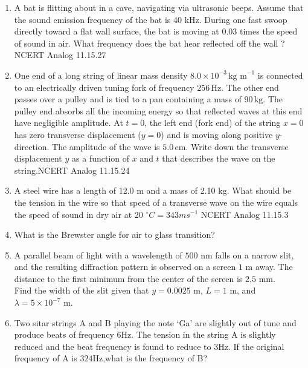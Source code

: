 \begin{enumerate}[label=\thesection.\arabic*,ref=\thesection.\theenumi]
\solution
\newpage

\item A bat is flitting about in a cave, navigating via ultrasonic beeps. Assume that the
sound emission frequency of the bat is 40 kHz. During one fast swoop directly
toward a flat wall surface, the bat is moving at 0.03 times the speed of sound in air.
What frequency does the bat hear reflected off the wall ? \hfill{NCERT Analog 11.15.27}\\
\solution
\pagebreak
\item One end of a long string of linear mass density $8.0 \times 10^{-3} \, \text{kg m}^{-1}$ is connected to an electrically driven tuning fork of frequency $256 \, \text{Hz}$. The other end passes over a pulley and is tied to a pan containing a mass of $90 \, \text{kg}$. The pulley end absorbs all the incoming energy so that reflected waves at this end have negligible amplitude. At $t=0$, the left end (fork end) of the string $x=0$ has zero transverse displacement ($y=0$) and is moving along positive $y$-direction. The amplitude of the wave is $5.0 \, \text{cm}$. Write down the transverse displacement $y$ as a function of $x$ and $t$ that describes the wave on the string.\hfill{NCERT Analog 11.15.24} \\
\solution
\pagebreak
\item A steel wire has a length of 12.0 m and a mass of 2.10 kg. What should be the
tension in the wire so that speed of a transverse wave on the wire equals the speed
of sound in dry air at 20 $^{\circ} C = 343ms^{-1}$ \hfill{NCERT Analog 11.15.3}\\
\solution
\pagebreak
\item What is the Brewster angle for air to glass transition?\\
\solution
\pagebreak
\item A parallel beam of light with a wavelength of $500$ nm falls on a narrow slit, and the resulting diffraction pattern is observed on a screen $1$ m away. The distance to the first minimum from the center of the screen is $2.5$ mm.\\
Find the width of the slit given that $y = 0.0025$ m, $L = 1$ m, and $\lambda = 5 \times 10^{-7}$ m.\\
\solution
\pagebreak

\item Two sitar strings A and B playing the note `Ga' are slightly out of tune and produce beats of frequency $6$Hz. The tension in the string A is slightly reduced and the beat frequency is found to reduce to $3$Hz. If the original frequency of A is $324$Hz,what is the frequency of B?\\
\solution
\pagebreak


\end{enumerate}
